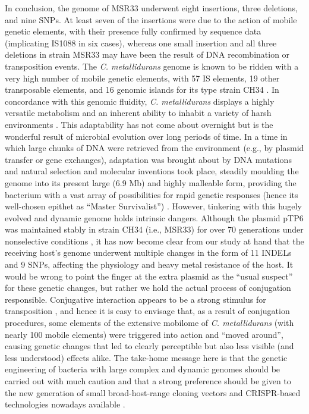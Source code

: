 In conclusion, the genome of MSR33 underwent eight insertions, three deletions, and nine SNPs. At least seven of the insertions were due to the action of mobile genetic elements, with their presence fully confirmed by sequence data (implicating IS1088 in six cases), whereas one small insertion and all three deletions in strain MSR33 may have been the result of DNA recombination or transposition events. The \textit{C. metallidurans} genome is known to be ridden with a very high number of mobile genetic elements, with 57 IS elements, 19 other transposable elements, and 16 genomic islands for its type strain CH34 \citep{janssen2010complete,van2009new,van2012variation}. In concordance with this genomic fluidity, \textit{C. metallidurans} displays a highly versatile metabolism and an inherent ability to inhabit a variety of harsh environments \citep{sobecky2009horizontal,sota2007region,leys2009response,mijnendonckx2013characterization,byloos2017impact}. This adaptability has not come about overnight but is the wonderful result of microbial evolution over long periods of time. In a time in which large chunks of DNA were retrieved from the environment (e.g., by plasmid transfer or gene exchanges), adaptation was brought about by DNA mutations and natural selection and molecular inventions took place, steadily moulding the genome into its present large (6.9 Mb) and highly malleable form, providing the bacterium with a vast array of possibilities for rapid genetic responses (hence its well-chosen epithet as “Master Survivalist”) \citep{janssen2010complete}. However, tinkering with this hugely evolved and dynamic genome holds intrinsic dangers. Although the plasmid pTP6 was maintained stably in strain CH34 (i.e., MSR33) for over 70 generations under nonselective conditions \citep{rojas2011characterization}, it has now become clear from our study at hand that the receiving host’s genome underwent multiple changes in the form of 11 INDELs and 9 SNPs, affecting the physiology and heavy metal resistance of the host. It would be wrong to point the finger at the extra plasmid as the “usual suspect” for these genetic changes, but rather we hold the actual process of conjugation responsible. Conjugative interaction appears to be a strong stimulus for transposition \citep{godoy2000transposon,christie2009conjugative,baharoglu2010conjugative}, and hence it is easy to envisage that, as a result of conjugation procedures, some elements of the extensive mobilome of \textit{C. metallidurans} (with nearly 100 mobile elements) were triggered into action and “moved around”, causing genetic changes that led to clearly perceptible but also less visible (and less understood) effects alike. The take-home message here is that the genetic engineering of bacteria with large complex and dynamic genomes should be carried out with much caution and that a strong preference should be given to the new generation of small broad-host-range cloning vectors and CRISPR-based technologies nowadays available \citep{jain2013broad,obranic2013improvement,tian2017fundamental,cook2018genetic,xiong2018genome}.

